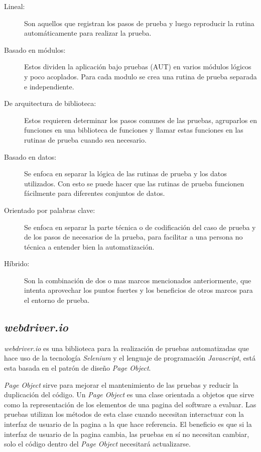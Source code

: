 \begin{description}
\item [Lineal:] Son aquellos que registran los pasos de prueba y luego
    reproducir la rutina automáticamente para realizar la prueba.
\item [Basado en módulos:] Estos dividen la aplicación bajo pruebas (AUT) en
    varios módulos lógicos y poco acoplados. Para cada modulo se crea una
    rutina de prueba separada e independiente.
\item [De arquitectura de biblioteca:] Estos requieren determinar los pasos
    comunes de las pruebas, agruparlos en funciones en una biblioteca de
    funciones y llamar estas funciones en las rutinas de prueba cuando sea
    necesario.
\item [Basado en datos:] Se enfoca en separar la lógica de las rutinas de
    prueba y los datos utilizados. Con esto se puede hacer que las rutinas
    de prueba funcionen fácilmente para diferentes conjuntos de datos.
\item [Orientado por palabras clave:] Se enfoca en separar la parte técnica
    o de codificación del caso de prueba y de los pasos de necesarios de la
    prueba, para facilitar a una persona no técnica a entender bien la
    automatización.
\item [Híbrido:] Son la combinación de dos o mas marcos mencionados
    anteriormente, que intenta aprovechar los puntos fuertes y los
    beneficios de otros marcos para el entorno de prueba.
\end{description}

\subsection{\emph{webdriver.io}}
\emph{webdriver.io} es una biblioteca para la realización de pruebas
automatizadas que hace uso de la tecnología \emph{Selenium} y el lenguaje de
programación \emph{Javascript}, está esta basada en el patrón de diseño
\emph{Page Object}.

\emph{Page Object} sirve para mejorar el mantenimiento de las pruebas y reducir
la duplicación del código. Un \emph{Page Object} es una clase orientada a
objetos que sirve como la representación de los elementos de una pagina del
software a evaluar. Las pruebas utilizan los métodos de esta clase cuando
necesitan interactuar con la interfaz de usuario de la pagina a la que hace
referencia. El beneficio es que si la interfaz de usuario de la pagina cambia,
las pruebas en sí no necesitan cambiar, solo el código dentro del
\emph{Page Object} necesitará actualizarse.

